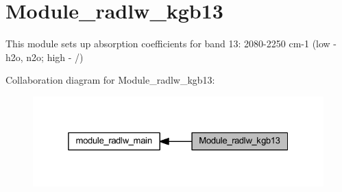 \hypertarget{group__module__radlw__kgb13}{}\section{Module\+\_\+radlw\+\_\+kgb13}
\label{group__module__radlw__kgb13}


This module sets up absorption coefficients for band 13\+: 2080-\/2250 cm-\/1 (low -\/ h2o, n2o; high -\/ /)  


Collaboration diagram for Module\+\_\+radlw\+\_\+kgb13\+:\nopagebreak
\begin{figure}[H]
\begin{center}
\leavevmode
\includegraphics[width=325pt]{group__module__radlw__kgb13}
\end{center}
\end{figure}

